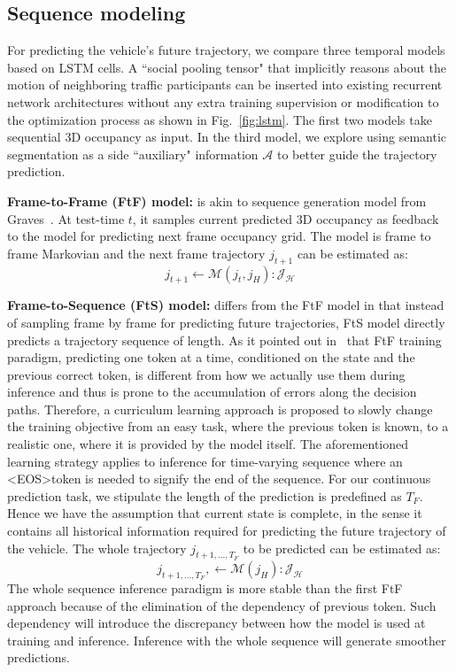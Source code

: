 \documentclass[10pt,twocolumn,letterpaper]{article}
\begin{document}
\subsection{Sequence modeling}

For predicting the vehicle's future trajectory, we compare three temporal models based on LSTM cells. A ``social pooling tensor" that implicitly reasons about the motion of neighboring traffic participants can be inserted into existing recurrent network architectures without any extra training supervision or modification to the optimization process as shown in Fig.~\ref{fig:lstm}. The first two models take sequential 3D occupancy as input. In the third model, we  explore using semantic segmentation as a side ``auxiliary" information $\mathcal{A}$ to better guide the trajectory prediction.

\vspace{\baselineskip}
\noindent \textbf{Frame-to-Frame (FtF) model:}
is akin to  sequence generation model from Graves~\cite{graves2013generating}.  At test-time $t$, it samples current predicted 3D occupancy as feedback to the model for predicting next frame occupancy grid. The model is frame to frame Markovian and the next frame trajectory $j_{t+1}$ can be estimated as:
\begin{equation}
j_{t+1} \leftarrow  \bm{\mathcal{M}}(j_t, j_H): \mathcal{J_H}
\label{eq:FtF}
\end{equation}

\vspace{\baselineskip}
\noindent \textbf{Frame-to-Sequence (FtS) model:}
differs from the FtF model in that instead of sampling frame by frame for predicting future trajectories, FtS model directly predicts a trajectory sequence of length.
As it pointed out in~\cite{bengio2015scheduled} that FtF training paradigm, predicting one token at a time, conditioned on the state and the previous correct token, is different from how we actually use them during inference and thus is prone to the accumulation of errors along the decision paths. 
Therefore, a curriculum learning approach is proposed to slowly change the training objective from an easy task, where the previous token is known, to a realistic one, where it is provided by the model itself.
The aforementioned learning strategy applies to inference for time-varying sequence where an \textless EOS\textgreater token is needed to signify the end of the sequence.
For our continuous prediction task, we stipulate the length of the prediction is predefined as $T_F$.
Hence we have the assumption that current state is complete, in the sense it contains all historical information required for predicting the future trajectory of the vehicle. 
The whole trajectory  $j_{t+1, \ldots, T_F}$ to be predicted can be estimated as:
\begin{equation}
j_{t+1, \ldots, T_F}, \leftarrow  \bm{\mathcal{M}}(j_H): \mathcal{J_H}
\label{eq:FtS}
\end{equation}
The whole sequence inference paradigm is more stable than the first FtF approach because of the elimination of the dependency of previous token. Such dependency will introduce the discrepancy between how the model is used at training and inference. Inference with the whole sequence will generate smoother predictions.
\end{document}
